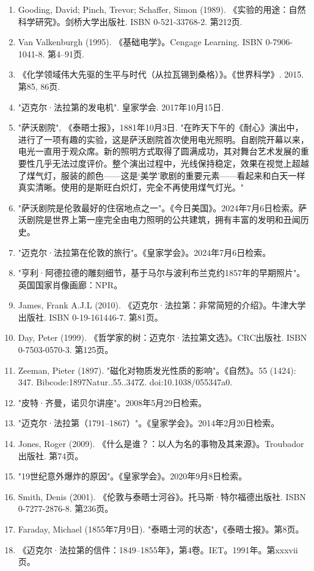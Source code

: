 \begin{enumerate}
\item Gooding, David; Pinch, Trevor; Schaffer, Simon (1989). 《实验的用途：自然科学研究》。剑桥大学出版社. ISBN 0-521-33768-2. 第212页.
\item Van Valkenburgh (1995). 《基础电学》。Cengage Learning. ISBN 0-7906-1041-8. 第4–91页.
\item 《化学领域伟大先驱的生平与时代（从拉瓦锡到桑格）》。《世界科学》. 2015. 第85, 86页.
\item "迈克尔·法拉第的发电机". 皇家学会. 2017年10月15日.
\item "萨沃剧院", 《泰晤士报》，1881年10月3日. "在昨天下午的《耐心》演出中，进行了一项有趣的实验，这是萨沃剧院首次使用电光照明。自剧院开幕以来，电光一直用于观众席。新的照明方式取得了圆满成功，其对舞台艺术发展的重要性几乎无法过度评价。整个演出过程中，光线保持稳定，效果在视觉上超越了煤气灯，服装的颜色——这是‘美学’歌剧的重要元素——看起来和白天一样真实清晰。使用的是斯旺白炽灯，完全不再使用煤气灯光。"
\item "萨沃剧院是伦敦最好的住宿地点之一"。《今日美国》。2024年7月6日检索。萨沃剧院是世界上第一座完全由电力照明的公共建筑，拥有丰富的发明和丑闻历史。
\item "迈克尔·法拉第在伦敦的旅行"。《皇家学会》。2024年7月6日检索。
\item "亨利·阿德拉德的雕刻细节，基于马尔与波利布兰克约1857年的早期照片"。英国国家肖像画廊：NPR。
\item James, Frank A.J.L (2010). 《迈克尔·法拉第：非常简短的介绍》。牛津大学出版社. ISBN 0-19-161446-7. 第81页。
\item Day, Peter (1999). 《哲学家的树：迈克尔·法拉第文选》。CRC出版社. ISBN 0-7503-0570-3. 第125页。
\item Zeeman, Pieter (1897). "磁化对物质发光性质的影响"。《自然》。55 (1424): 347. Bibcode:1897Natur..55..347Z. doi:10.1038/055347a0.
\item "皮特·齐曼，诺贝尔讲座"。2008年5月29日检索。
\item "迈克尔·法拉第（1791–1867）"。《皇家学会》。2014年2月20日检索。
\item Jones, Roger (2009). 《什么是谁？：以人为名的事物及其来源》。Troubador出版社. 第74页。
\item "19世纪意外爆炸的原因"。《皇家学会》。2020年9月8日检索。
\item Smith, Denis (2001). 《伦敦与泰晤士河谷》。托马斯·特尔福德出版社. ISBN 0-7277-2876-8. 第236页。
\item Faraday, Michael (1855年7月9日). "泰晤士河的状态"，《泰晤士报》。第8页。
\item 《迈克尔·法拉第的信件：1849–1855年》，第4卷。IET。1991年。第xxxvii页。

\end{enumerate}
